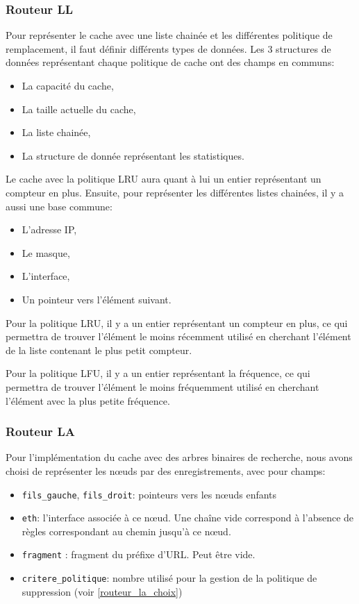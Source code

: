 \documentclass{article}
\begin{document}
\subsubsection{Routeur LL}
Pour représenter le cache avec une liste chainée et les différentes politique de remplacement, il faut définir différents types de données. Les 3 structures de données représentant chaque politique de cache ont des champs en communs:
\begin{itemize}
    \item La capacité du cache,
    \item La taille actuelle du cache,
    \item La liste chainée,
    \item La structure de donnée représentant les statistiques.
\end{itemize}
Le cache avec la politique LRU aura quant à lui un entier représentant un compteur en plus.
\newline
Ensuite, pour représenter les différentes listes chainées, il y a aussi une base commune:
\begin{itemize}
    \item L'adresse IP,
    \item Le masque,
    \item L'interface,
    \item Un pointeur vers l'élément suivant.
\end{itemize}\par
Pour la politique LRU, il y a un entier représentant un compteur en plus, ce qui permettra de trouver l'élément le moins récemment utilisé en cherchant l'élément de la liste contenant le plus petit compteur. \par 
Pour la politique LFU, il y a un entier représentant la fréquence, ce qui permettra de trouver l'élément le moins fréquemment utilisé en cherchant l'élément avec la plus petite fréquence.

\subsubsection{Routeur LA}

Pour l'implémentation du cache avec des arbres binaires de recherche, nous avons choisi de représenter les nœuds par des enregistrements, avec pour champs:

\begin{itemize}
    \item \verb|fils_gauche|, \verb|fils_droit|: pointeurs vers les nœuds enfants
    \item \verb|eth|: l'interface associée à ce nœud. Une chaîne vide correspond à l'absence de règles correspondant au chemin jusqu'à ce nœud.
    \item \verb|fragment| : fragment du préfixe d'URL. Peut être vide.
    \item \verb|critere_politique|: nombre utilisé pour la gestion de la politique de suppression (voir \ref{routeur_la_choix})
\end{itemize}
\end{document}
